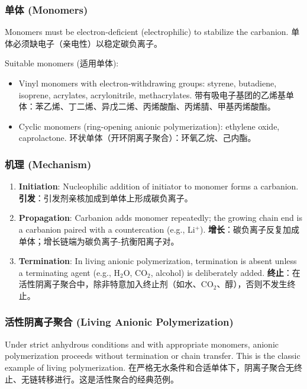 \documentclass[12pt,a4paper]{ctexart}
\begin{document}
\subsubsection{单体 (Monomers)}
Monomers must be electron-deficient (electrophilic) to stabilize the carbanion.  
单体必须缺电子（亲电性）以稳定碳负离子。

Suitable monomers (适用单体):
\begin{itemize}
    \item Vinyl monomers with electron-withdrawing groups: styrene, butadiene, isoprene, acrylates, acrylonitrile, methacrylates.  
      带有吸电子基团的乙烯基单体：苯乙烯、丁二烯、异戊二烯、丙烯酸酯、丙烯腈、甲基丙烯酸酯。
    \item Cyclic monomers (ring-opening anionic polymerization): ethylene oxide, caprolactone.  
      环状单体（开环阴离子聚合）：环氧乙烷、己内酯。
\end{itemize}

\subsubsection{机理 (Mechanism)}
\begin{enumerate}
    \item \textbf{Initiation}: Nucleophilic addition of initiator to monomer forms a carbanion.  
      \textbf{引发}：引发剂亲核加成到单体上形成碳负离子。
    \item \textbf{Propagation}: Carbanion adds monomer repeatedly; the growing chain end is a carbanion paired with a countercation (e.g., Li$^+$).  
      \textbf{增长}：碳负离子反复加成单体；增长链端为碳负离子-抗衡阳离子对。
    \item \textbf{Termination}: In living anionic polymerization, termination is absent unless a terminating agent (e.g., H$_2$O, CO$_2$, alcohol) is deliberately added.  
      \textbf{终止}：在活性阴离子聚合中，除非特意加入终止剂（如水、CO$_2$、醇），否则不发生终止。
\end{enumerate}

\subsubsection{活性阴离子聚合 (Living Anionic Polymerization)}
Under strict anhydrous conditions and with appropriate monomers, anionic polymerization proceeds without termination or chain transfer. This is the classic example of living polymerization.  
在严格无水条件和合适单体下，阴离子聚合无终止、无链转移进行。这是活性聚合的经典范例。
\end{document}
